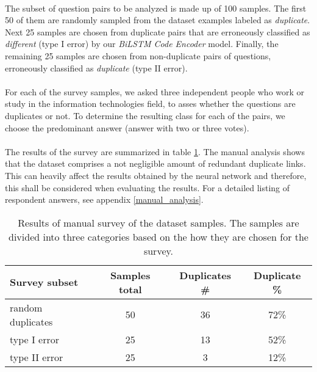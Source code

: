 \paragraph{}
The subset of question pairs to be analyzed is made up of 100 samples. The first 50 of them are randomly sampled from the dataset examples labeled as \textit{duplicate}. Next 25 samples are chosen from duplicate pairs that are erroneously classified as \textit{different} (type I error) by our \textit{BiLSTM Code Encoder} model. Finally, the remaining 25 samples are chosen from non-duplicate pairs of questions, erroneously classified as \textit{duplicate} (type II error).

\paragraph{}
For each of the survey samples, we asked three independent people who work or study in the information technologies field, to asses whether the questions are duplicates or not. To determine the resulting class for each of the pairs, we choose the predominant answer (answer with two or three votes).

\paragraph{}
The results of the survey are summarized in table \ref{manual_surver_results}. The manual analysis shows that the dataset comprises a not negligible amount of redundant duplicate links. This can heavily affect the results obtained by the neural network and therefore, this shall be considered when evaluating the results. For a detailed listing of respondent answers, see appendix \ref{manual_analysis}.

\smallskip{}
\begin{table}[!h]
	\centering
	\begin{tabular}{l c c c} 
		\hline
		\textbf{Survey subset} & \textbf{Samples total} & \textbf{Duplicates \#} & \textbf{Duplicate \%}  \\ 
		\hline\hline
		random duplicates & 50 & 36 & 72\% \\
		type I error      & 25 & 13 & 52\% \\
		type II error     & 25 & 3  & 12\% \\
		\hline
	\end{tabular}
	\caption{Results of manual survey of the dataset samples. The samples are divided into three categories based on the how they are chosen for the survey.}
	\label{manual_surver_results}
\end{table}


